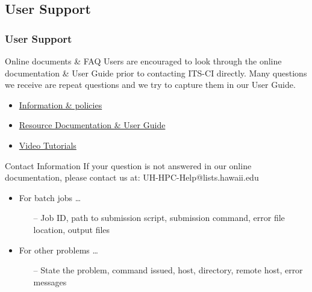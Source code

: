 

\subsection{User Support}
\begin{frame}
  \frametitle{User Support}

  \begin{block}{Online documents \& FAQ}
    Users are encouraged to look through the online documentation \& User Guide prior to contacting ITS-CI directly.  Many questions we receive are repeat questions and we try to capture them in our User Guide.~\\
		\begin{itemize}
		\item \href{http://datascience.hawaii.edu/hpc/}{Information \& policies}
		\item \href{http://go.hawaii.edu/JLA}{Resource Documentation \& User Guide}
		\item \href{http://go.hawaii.edu/3A8}{Video Tutorials}
		\end{itemize}
  \end{block}
  \begin{block}{Contact Information}
    If your question is not answered in our online documentation, please contact us at: UH-HPC-Help@lists.hawaii.edu
    
    \begin{itemize}
    \item For batch jobs \ldots
      \begin{itemize}
      \item[--] Job ID, path to submission script, submission command, error file location, output files
      \end{itemize} 
    \item For other problems \ldots
      \begin{itemize}
      \item[--] State the problem, command issued, host, directory, remote host, error messages
      \end{itemize}
    \end{itemize}
  \end{block}
\end{frame}

